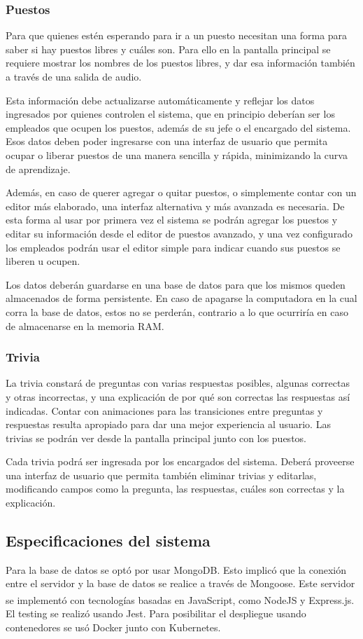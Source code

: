 \documentclass{article}
\begin{document}
\subsubsection{Puestos}
Para que quienes estén esperando para ir a un puesto necesitan una forma para saber si hay puestos libres y cuáles son. Para ello en la pantalla principal se requiere mostrar los nombres de los puestos libres, y dar esa información también a través de una salida de audio.

Esta información debe actualizarse automáticamente y reflejar los datos ingresados por quienes controlen el sistema, que en principio deberían ser los empleados que ocupen los puestos, además de su jefe o el encargado del sistema. Esos datos deben poder ingresarse con una interfaz de usuario que permita ocupar o liberar puestos de una manera sencilla y rápida, minimizando la curva de aprendizaje. 

Además, en caso de querer agregar o quitar puestos, o simplemente contar con un editor más elaborado, una interfaz alternativa y más avanzada es necesaria. De esta forma al usar por primera vez el sistema se podrán agregar los puestos y editar su información desde el editor de puestos avanzado, y una vez configurado los empleados podrán usar el editor simple para indicar cuando sus puestos se liberen u ocupen.

Los datos deberán guardarse en una base de datos para que los mismos queden almacenados de forma persistente. En caso de apagarse la computadora en la cual corra la base de datos, estos no se perderán, contrario a lo que ocurriría en caso de almacenarse en la memoria RAM.
\subsubsection{Trivia}
La trivia constará de preguntas con varias respuestas posibles, algunas correctas y otras incorrectas, y una explicación de por qué son correctas las respuestas así indicadas. Contar con animaciones para las transiciones entre preguntas y respuestas resulta apropiado para dar una mejor experiencia al usuario. Las trivias se podrán ver desde la pantalla principal junto con los puestos.

Cada trivia podrá ser ingresada por los encargados del sistema. Deberá proveerse una interfaz de usuario que permita también eliminar trivias y editarlas, modificando campos como la pregunta, las respuestas, cuáles son correctas y la explicación.
\newpage
\subsection{Especificaciones del sistema}
Para la base de datos se optó por usar MongoDB. Esto implicó que la conexión entre el servidor y la base de datos se realice a través de Mongoose. Este servidor se implementó con tecnologías basadas en JavaScript, como NodeJS\textsuperscript{\textregistered} y Express.js. El testing se realizó usando Jest. Para posibilitar el despliegue usando contenedores se usó Docker junto con Kubernetes.
\end{document}
